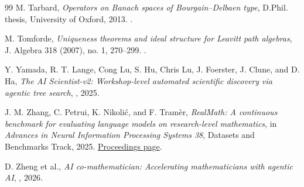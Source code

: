 \documentclass[11pt,reqno]{amsart}
\theoremstyle{plain}
\theoremstyle{definition}
\begin{document}
\begin{thebibliography}{99}
M. Tarbard,
\newblock \emph{Operators on Banach spaces of Bourgain--Delbaen type},
\newblock D.Phil. thesis, University of Oxford, 2013.
\newblock {}.

M. Tomforde,
\newblock \emph{Uniqueness theorems and ideal structure for Leavitt path algebras},
\newblock J. Algebra 318 (2007), no. 1, 270--299.
\newblock {}.

Y. Yamada, R. T. Lange, Cong Lu, S. Hu, Chris Lu, J. Foerster,
J. Clune, and D. Ha,
\newblock \emph{The AI Scientist-v2: Workshop-level automated scientific discovery via agentic tree search},
\newblock {}, 2025.

J. M. Zhang, C. Petrui, K. Nikoli\'c, and F. Tram\`er,
\newblock \emph{RealMath: A continuous benchmark for evaluating language models on research-level mathematics},
\newblock in \emph{Advances in Neural Information Processing Systems 38}, Datasets and Benchmarks Track, 2025.
\newblock \href{https://proceedings.neurips.cc/paper_files/paper/2025/hash/734abb86d3caa949f44da8a093717f61-Abstract-Datasets_and_Benchmarks_Track.html}{Proceedings page}.

D. Zheng et al.,
\newblock \emph{AI co-mathematician: Accelerating mathematicians with agentic AI},
\newblock {}, 2026.

\end{thebibliography}
\end{document}
